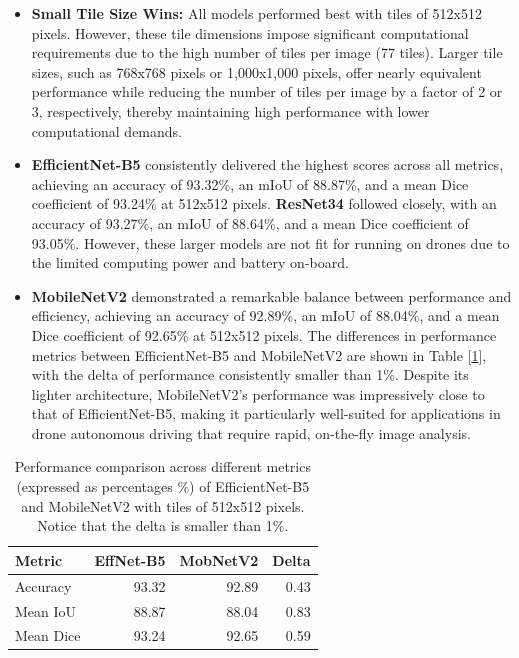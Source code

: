 \documentclass[a4paper]{article}
\begin{document}
\begin{itemize}
    \item \textbf{Small Tile Size Wins:} All models performed best with tiles of 512x512 pixels. However, these tile dimensions impose significant computational requirements due to the high number of tiles per image (77 tiles). Larger tile sizes, such as 768x768 pixels or 1,000x1,000 pixels, offer nearly equivalent performance while reducing the number of tiles per image by a factor of 2 or 3, respectively, thereby maintaining high performance with lower computational demands.
    \item \textbf{EfficientNet-B5} consistently delivered the highest scores across all metrics, achieving an accuracy of 93.32\%, an mIoU of 88.87\%, and a mean Dice coefficient of 93.24\% at 512x512 pixels. \textbf{ResNet34} followed closely, with an accuracy of 93.27\%, an mIoU of 88.64\%, and a mean Dice coefficient of 93.05\%. However, these larger models are not fit for running on drones due to the limited computing power and battery on-board.
    \item \textbf{MobileNetV2} demonstrated a remarkable balance between performance and efficiency, achieving an accuracy of 92.89\%, an mIoU of 88.04\%, and a mean Dice coefficient of 92.65\% at 512x512 pixels. The differences in performance metrics between EfficientNet-B5 and MobileNetV2 are shown in Table [\ref{tab:delta_table}], with the delta of performance consistently smaller than 1\%. Despite its lighter architecture, MobileNetV2's performance was impressively close to that of EfficientNet-B5, making it particularly well-suited for applications in drone autonomous driving that require rapid, on-the-fly image analysis.
\end{itemize}

\begin{table}[!htbp]
    \centering
    \small
    \setlength{\tabcolsep}{5pt} %
    \begin{tabular}{|l|r|r|r|}
    \hline
     Metric    &  EffNet-B5 & MobNetV2 & Delta \\ \hline
     Accuracy    &  93.32 & 92.89 & 0.43 \\ \hline
     Mean IoU    &  88.87 & 88.04 & 0.83 \\ \hline
     Mean Dice    & 93.24 & 92.65 & 0.59 \\ \hline
    \end{tabular}
    \caption{Performance comparison across different metrics (expressed as percentages \%) of EfficientNet-B5 and MobileNetV2 with tiles of 512x512 pixels. Notice that the delta is smaller than 1\%.}
    \label{tab:delta_table}
\end{table}
\end{document}
